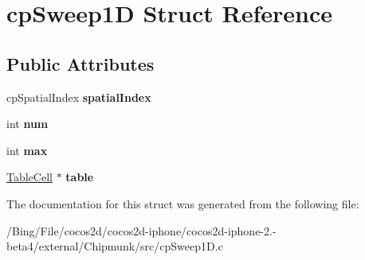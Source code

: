 \hypertarget{structcp_sweep1_d}{\section{cp\-Sweep1\-D Struct Reference}
\label{structcp_sweep1_d}
}
\subsection*{Public Attributes}
\begin{DoxyCompactItemize}
\item 
\hypertarget{structcp_sweep1_d_a8dca6fd803ba699f50498e412eb4fbb5}{cp\-Spatial\-Index {\bfseries spatial\-Index}}\label{structcp_sweep1_d_a8dca6fd803ba699f50498e412eb4fbb5}

\item 
\hypertarget{structcp_sweep1_d_a269d9bfd9af004776ccf3d1c8ceee8a7}{int {\bfseries num}}\label{structcp_sweep1_d_a269d9bfd9af004776ccf3d1c8ceee8a7}

\item 
\hypertarget{structcp_sweep1_d_a457c6f7f7b3a1f2d43b6b78a6c792fbb}{int {\bfseries max}}\label{structcp_sweep1_d_a457c6f7f7b3a1f2d43b6b78a6c792fbb}

\item 
\hypertarget{structcp_sweep1_d_ae5c938ba7e0c6540cd65e1130d48fdc7}{\hyperlink{struct_table_cell}{Table\-Cell} $\ast$ {\bfseries table}}\label{structcp_sweep1_d_ae5c938ba7e0c6540cd65e1130d48fdc7}

\end{DoxyCompactItemize}


The documentation for this struct was generated from the following file\-:\begin{DoxyCompactItemize}
\item 
/\-Bing/\-File/cocos2d/cocos2d-\/iphone/cocos2d-\/iphone-\/2.-\/beta4/external/\-Chipmunk/src/cp\-Sweep1\-D.\-c\end{DoxyCompactItemize}
